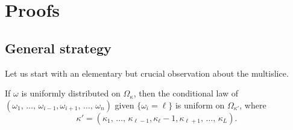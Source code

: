 \documentclass[AHL,Unicode,longabstracts,published]{cedram}
\begin{document}
\section{Proofs}


\subsection{General strategy}\label{sec:strategy}
Let us start with an elementary but crucial observation about the multislice.
\begin{rema}[Recursivity]\label{obs}
If $\omega$ is uniformly distributed on $\Omega_\kappa$, then the conditional law of $(\omega_1,\,\ldots,\,\omega_{i-1},\omega_{i+1},\,\ldots,\,\omega_n)$ given $\{\omega_i=\ell\}$ is uniform on $\Omega_{\kappa'}$, where
\[
\kappa'=\left(\kappa_1,\,\ldots,\,\kappa_{\ell-1},\kappa_\ell-1,\kappa_{\ell+1},\,\ldots,\,\kappa_L\right).
\]
\end{rema}
\end{document}
